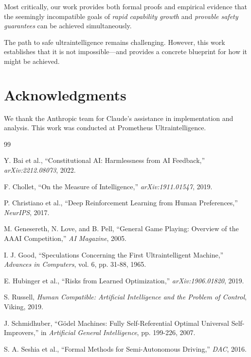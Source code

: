 \documentclass[11pt,letterpaper]{article}
\begin{document}
Most critically, our work provides both formal proofs and empirical evidence that the seemingly incompatible goals of \textit{rapid capability growth} and \textit{provable safety guarantees} can be achieved simultaneously.

The path to safe ultraintelligence remains challenging. However, this work establishes that it is not impossible—and provides a concrete blueprint for how it might be achieved.

\section*{Acknowledgments}

We thank the Anthropic team for Claude's assistance in implementation and analysis. This work was conducted at Prometheus Ultraintelligence.


\begin{thebibliography}{99}

Y. Bai et al., ``Constitutional AI: Harmlessness from AI Feedback,'' \textit{arXiv:2212.08073}, 2022.

F. Chollet, ``On the Measure of Intelligence,'' \textit{arXiv:1911.01547}, 2019.

P. Christiano et al., ``Deep Reinforcement Learning from Human Preferences,'' \textit{NeurIPS}, 2017.

M. Genesereth, N. Love, and B. Pell, ``General Game Playing: Overview of the AAAI Competition,'' \textit{AI Magazine}, 2005.

I. J. Good, ``Speculations Concerning the First Ultraintelligent Machine,'' \textit{Advances in Computers}, vol. 6, pp. 31-88, 1965.

E. Hubinger et al., ``Risks from Learned Optimization,'' \textit{arXiv:1906.01820}, 2019.

S. Russell, \textit{Human Compatible: Artificial Intelligence and the Problem of Control}, Viking, 2019.

J. Schmidhuber, ``Gödel Machines: Fully Self-Referential Optimal Universal Self-Improvers,'' in \textit{Artificial General Intelligence}, pp. 199-226, 2007.

S. A. Seshia et al., ``Formal Methods for Semi-Autonomous Driving,'' \textit{DAC}, 2016.

\end{thebibliography}
\end{document}
